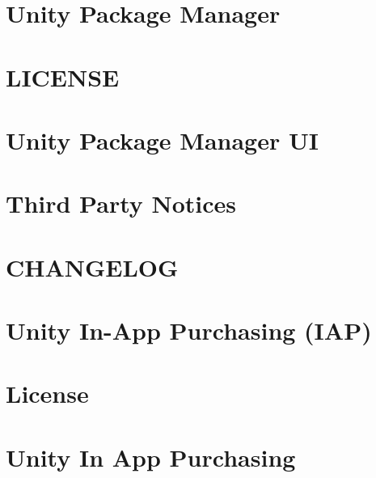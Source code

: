 \let\mypdfximage\pdfximage\def\pdfximage{\immediate\mypdfximage}\documentclass[twoside]{book}
\newcommand{\+}{\discretionary{\mbox{\scriptsize$\hookleftarrow$}}{}{}}
\begin{document}
\chapter{Unity Package Manager}
\label{autotoc_md68}

\chapter{L\+I\+C\+E\+N\+SE}
\label{md_Library_PackageCache_com_8unity_8package-manager-ui_0d2_80_83_LICENSE}

\chapter{Unity Package Manager UI}
\label{autotoc_md94}

\chapter{Third Party Notices}
\label{md_Library_PackageCache_com_8unity_8package-manager-ui_0d2_80_83_Third_Party_Notices}

\chapter{C\+H\+A\+N\+G\+E\+L\+OG}
\label{md_Library_PackageCache_com_8unity_8purchasing_0d2_80_83_CHANGELOG}

\chapter{Unity In-\/\+App Purchasing (I\+AP)}
\label{autotoc_md95}

\chapter{License}
\label{md_Library_PackageCache_com_8unity_8purchasing_0d2_80_83_License}

\chapter{Unity In App Purchasing}
\label{autotoc_md96}

\end{document}
